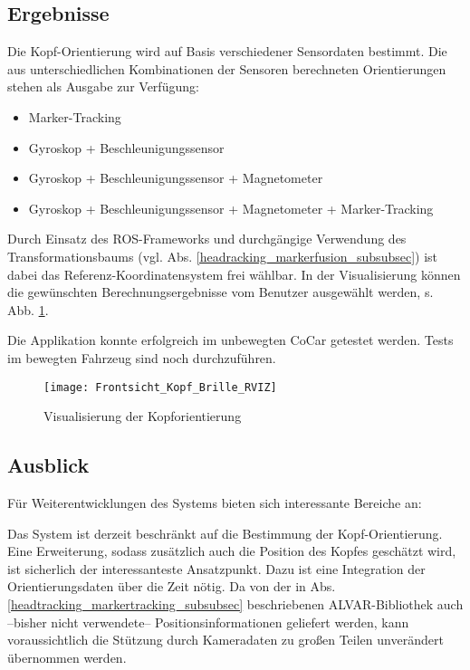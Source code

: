 
\subsection{Ergebnisse}

Die Kopf-Orientierung wird auf Basis verschiedener Sensordaten bestimmt.
Die aus unterschiedlichen Kombinationen der Sensoren berechneten Orientierungen stehen als Ausgabe zur Verfügung:
\begin{itemize}
  \item Marker-Tracking
  \item Gyroskop + Beschleunigungssensor
  \item Gyroskop + Beschleunigungssensor + Magnetometer
  \item Gyroskop + Beschleunigungssensor + Magnetometer + Marker-Tracking
\end{itemize}

Durch Einsatz des \ac{ROS}-Frameworks und durchgängige Verwendung des Transformationsbaums (vgl. Abs. \ref{headracking_markerfusion_subsubsec}) ist dabei das Referenz-Koordinatensystem frei wählbar.
In der Visualisierung können die gewünschten Berechnungsergebnisse vom Benutzer ausgewählt werden, s. Abb. \ref{fig:kopf_orientierung_rviz}.


Die Applikation konnte erfolgreich im unbewegten CoCar getestet werden.
Tests im bewegten Fahrzeug sind noch durchzuführen.


\begin{figure}
  \centering
  \texttt{[image: Frontsicht\_Kopf\_Brille\_RVIZ]}
  \caption{Visualisierung der Kopforientierung}
  \label{fig:kopf_orientierung_rviz}
\end{figure}


\subsection{Ausblick}

Für Weiterentwicklungen des Systems bieten sich interessante Bereiche an:

Das System ist derzeit beschränkt auf die Bestimmung der Kopf-Orientierung.
Eine Erweiterung, sodass zusätzlich auch die Position des Kopfes geschätzt wird, ist sicherlich der interessanteste Ansatzpunkt.
Dazu ist eine Integration der Orientierungsdaten über die Zeit nötig.
Da von der in Abs. \ref{headtracking_markertracking_subsubsec} beschriebenen ALVAR-Bibliothek auch --bisher nicht verwendete-- Positionsinformationen geliefert werden, kann voraussichtlich die Stützung durch Kameradaten zu großen Teilen unverändert übernommen werden.

